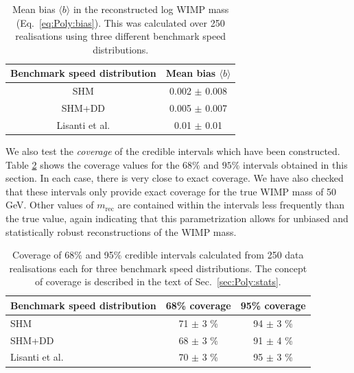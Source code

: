 \begin{table}[t]
  \setlength{\extrarowheight}{3pt}
  \setlength{\tabcolsep}{3pt}
  \begin{center}
	\begin{tabular}{c|c}
        \hline\hline
	Benchmark speed distribution & Mean bias $\langle b \rangle$ \\
	\hline
	SHM & 0.002 $\pm$ 0.008 \\
	SHM+DD & 0.005 $\pm$ 0.007 \\
	Lisanti et al. & 0.01 $\pm$ 0.01 \\
        \hline\hline
	\end{tabular}
  \end{center}
\caption{Mean bias $\langle b \rangle$ in the reconstructed log WIMP mass (Eq.~\ref{eq:Poly:bias}). This was calculated over 250 realisations using three different benchmark speed distributions.}
\label{tab:Poly:bias}
\end{table}

We also test the \textit{coverage} of the credible intervals which have been constructed.  Table \ref{tab:Poly:coverage} shows the coverage values for the $68\%$ and $95\%$ intervals obtained in this section. In each case, there is very close to exact coverage. We have also checked that these intervals only provide exact coverage for the true WIMP mass of 50 GeV. Other values of $m_\textrm{rec}$ are contained within the intervals less frequently than the true value, again indicating that this parametrization allows for unbiased and statistically robust reconstructions of the WIMP mass.

\begin{table}[t]
  \setlength{\extrarowheight}{3pt}
  \setlength{\tabcolsep}{3pt}
  \begin{center}
	\begin{tabular}{m{1in}|cc}
        \hline\hline
	Benchmark speed distribution & 68\% coverage & 95\% coverage\\
	\hline
	SHM &  71 $\pm$ 3 \% & 94 $\pm$ 3 \%  \\
	SHM+DD & 68 $\pm$ 3 \% & 91 $\pm$ 4 \%  \\
	Lisanti et al. & 70 $\pm$ 3 \% & 95 $\pm$ 3 \%  \\
        \hline \hline
	\end{tabular}
  \end{center}
\caption{Coverage of 68\% and 95\% credible intervals calculated from 250 data realisations each for three benchmark speed distributions. The concept of coverage is described in the text of Sec.~\ref{sec:Poly:stats}.}
\label{tab:Poly:coverage}
\end{table}

